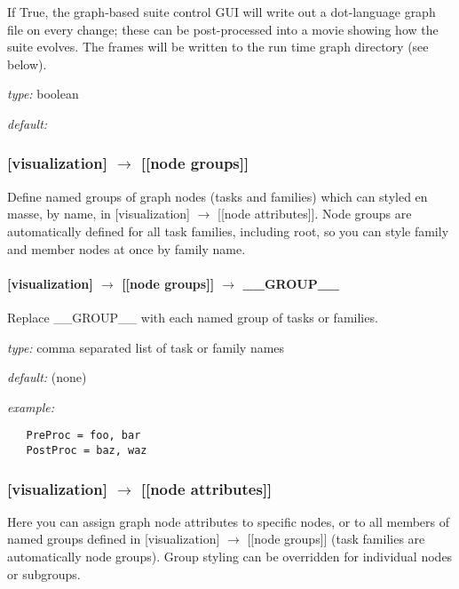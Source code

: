 If True, the graph-based suite control GUI will write out a dot-language
graph file on every change; these can be post-processed into a movie
showing how the suite evolves. The frames will be written to the run
time graph directory (see below).

\begin{myitemize}
    \item {\em type:} boolean
    \item {\em default:} \lstinline@False@
\end{myitemize}

\subsubsection[{[[}node groups{]]}]{[visualization] $\rightarrow$ [[node groups]]}

Define named groups of graph nodes (tasks and families) which can styled
en masse, by name, in [visualization] $\rightarrow$ [[node attributes]].
Node groups are automatically defined for all task families, including
root, so you can style family and member nodes at once by family name.

\paragraph[\_\_GROUP\_\_]{[visualization] $\rightarrow$ [[node groups]] $\rightarrow$ \_\_GROUP\_\_}

Replace \_\_GROUP\_\_ with each named group of tasks or families.

\begin{myitemize}
    \item {\em type:} comma separated list of task or family names
    \item {\em default:} (none)
    \item {\em example:}
\begin{lstlisting}
   PreProc = foo, bar
   PostProc = baz, waz
\end{lstlisting}
\end{myitemize}

\subsubsection[{[[}node attributes{]]}]{[visualization] $\rightarrow$ [[node attributes]]}

Here you can assign graph node attributes to specific nodes, or to all
members of named groups defined in [visualization] $\rightarrow$ [[node
groups]] (task families are automatically node groups). Group styling 
can be overridden for individual nodes or subgroups.

